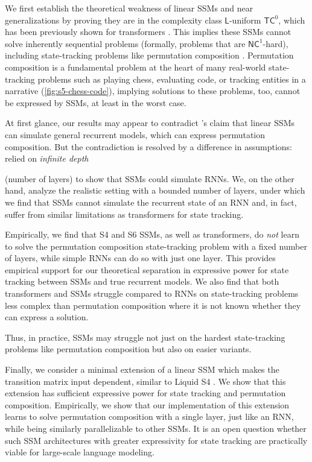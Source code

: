 We first establish the theoretical weakness of linear SSMs and near generalizations by proving they are in the complexity class $\mathsf{L}$-uniform $\mathsf{TC}^0$, which has been previously shown for transformers \citep{merrill-sabharwal-2023-parallelism}. This implies these SSMs cannot solve inherently sequential problems (formally, problems that are $\mathsf{NC}^1$-hard), including state-tracking problems like permutation composition \citep{liu2023transformers}. Permutation composition is a fundamental problem at the heart of many real-world state-tracking problems such as playing chess, evaluating code, or tracking entities in a narrative (\ref{fig:s5-chess-code}), implying solutions to these problems, too, cannot be expressed by SSMs, at least in the worst case.

At first glance, our results may appear to contradict \citet{gu2021combining}'s claim that linear SSMs can simulate general recurrent models, which can express permutation composition. But the contradiction is resolved by a difference in assumptions: \citet{gu2021combining} relied on \emph{infinite depth}

(number of layers) to show that SSMs could simulate RNNs. We, on the other hand, analyze the realistic setting with a bounded number of layers, under which we find that SSMs cannot simulate the recurrent state of an RNN and, in fact, suffer from similar limitations as transformers for state tracking.

Empirically, we find that S4 \citep{gu2022efficiently} and S6 \citep{gu2023mamba} SSMs, as well as transformers, do \emph{not} learn to solve the permutation composition state-tracking problem with a fixed number of layers, while simple RNNs can do so with just one layer. This provides empirical support for our theoretical separation in expressive power for state tracking between SSMs and true recurrent models. We also find that both transformers and SSMs struggle compared to RNNs on state-tracking problems less complex than permutation composition where it is not known whether they can express a solution.

Thus, in practice, SSMs may struggle not just on the hardest state-tracking problems like permutation composition but also on easier variants.

Finally, we consider a minimal extension of a linear SSM which makes the transition matrix input dependent, similar to Liquid S4 \cite{hasani2023liquid}. We show that this extension has sufficient expressive power for state tracking and permutation composition. Empirically, we show that our implementation of this extension learns to solve permutation composition with a single layer, just like an RNN, while being similarly parallelizable to other SSMs. It is an open question whether such SSM architectures with greater expressivity for state tracking are practically viable for large-scale language modeling.

